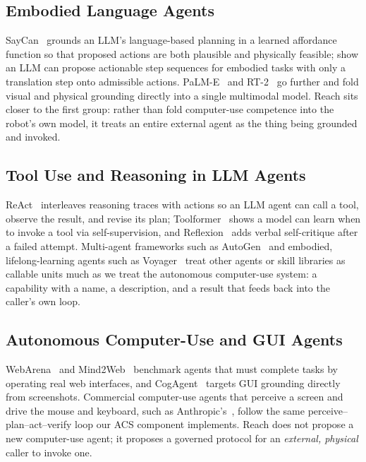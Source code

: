 \documentclass{article}
\begin{document}
\subsection{Embodied Language Agents}
\label{sec:embodied-agents}
SayCan~\citep{ahn2022saycan} grounds an LLM's language-based planning in a learned affordance function so that proposed actions are both plausible and physically feasible; \citet{huang2022zeroshot} show an LLM can propose actionable step sequences for embodied tasks with only a translation step onto admissible actions. PaLM-E~\citep{driess2023palme} and RT-2~\citep{brohan2023rt2} go further and fold visual and physical grounding directly into a single multimodal model. Reach sits closer to the first group: rather than fold computer-use competence into the robot's own model, it treats an entire external agent as the thing being grounded and invoked.

\subsection{Tool Use and Reasoning in LLM Agents}
ReAct~\citep{yao2023react} interleaves reasoning traces with actions so an LLM agent can call a tool, observe the result, and revise its plan; Toolformer~\citep{schick2023toolformer} shows a model can learn when to invoke a tool via self-supervision, and Reflexion~\citep{shinn2023reflexion} adds verbal self-critique after a failed attempt. Multi-agent frameworks such as AutoGen~\citep{wu2023autogen} and embodied, lifelong-learning agents such as Voyager~\citep{wang2023voyager} treat other agents or skill libraries as callable units much as we treat the autonomous computer-use system: a capability with a name, a description, and a result that feeds back into the caller's own loop.

\subsection{Autonomous Computer-Use and GUI Agents}
WebArena~\citep{zhou2024webarena} and Mind2Web~\citep{deng2023mind2web} benchmark agents that must complete tasks by operating real web interfaces, and CogAgent~\citep{hong2024cogagent} targets GUI grounding directly from screenshots. Commercial computer-use agents that perceive a screen and drive the mouse and keyboard, such as Anthropic's~\citep{anthropic2024computeruse}, follow the same perceive--plan--act--verify loop our ACS component implements. Reach does not propose a new computer-use agent; it proposes a governed protocol for an \emph{external, physical} caller to invoke one.
\end{document}
